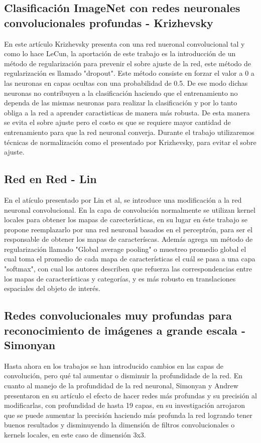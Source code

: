 \subsection{Clasificación ImageNet con redes neuronales convolucionales profundas - Krizhevsky}
En este artículo Krizhevsky presenta con una red nueronal convolucional tal y como lo hace LeCun, la aportación de este trabajo es la introducción de un método de regularización para prevenir el sobre ajuste de la red, este método de regularización es llamado "dropout". Este método consiste en forzar el valor a 0 a las neuronas en capas ocultas con una probabilidad de 0.5. De ese modo dichas neuronas no contribuyen a la clasificación haciendo que el entrenamiento no dependa de las mismas neuronas para realizar la clasificación y por lo tanto obliga a la red a aprender caractisticas de manera más robusta. De esta manera se evita el sobre ajuste pero el costo es que se requiere mayor cantidad de entrenamiento para que la red neuronal converja.
Durante el trabajo utilizaremos técnicas de normalización como el presentado por Krizhevsky, para evitar el sobre ajuste.

\subsection{Red en Red - Lin}
En el atículo presentado por Lin et al, se introduce una modificación a la red neuronal convolucional. En la capa de convolución normalmente se utilizan kernel locales para obtener los mapas de carecterísticas, en su lugar en éste trabajo se propone reemplazarlo por una red neuronal basados en el perceptrón, para ser el responsable de obtener los mapas de caracteríscas. Además agrega un método de regularización llamado "Global average pooling" o muestreo promedio global el cual toma el promedio de cada mapa de características el cuál se pasa a una capa "softmax", con cual los autores describen que refuerza las correspondencias entre los mapas de características y categorías, y es más robusto en translaciones espaciales del objeto de interés.

\subsection{Redes convolucionales muy profundas para reconocimiento de imágenes a grande escala - Simonyan}
Hasta ahora en los trabajos se han introducido cambios en las capas de convolución, pero qué tal aumentar o disminuir la profundidade de la red. En cuanto al manejo de la profundidad de la red neuronal, Simonyan y Andrew presentaron en su artículo el efecto de hacer redes más profundas y su precisión al modificarlas, con profundidad de hasta 19 capas, en su investigación arrojaron que se puede aumentar la precisión haciendo más profunda la red logrando tener buenos resultados y disminuyendo la dimensión de filtros convolucionales o kernels locales, en este caso de dimensión 3x3.

